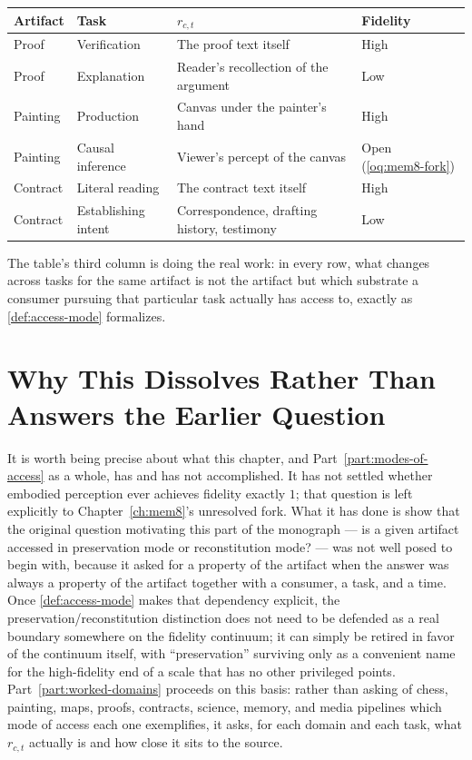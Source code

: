 \begin{center}
\begin{tabular}{lp{2.7cm}p{2.7cm}p{2.7cm}}
\toprule
Artifact & Task & $r_{c,t}$ & Fidelity \\
\midrule
Proof & Verification & The proof text itself & High \\
Proof & Explanation & Reader's recollection of the argument & Low \\
Painting & Production & Canvas under the painter's hand & High \\
Painting & Causal inference & Viewer's percept of the canvas & Open (\cref{oq:mem8-fork}) \\
Contract & Literal reading & The contract text itself & High \\
Contract & Establishing intent & Correspondence, drafting history, testimony & Low \\
\bottomrule
\end{tabular}
\end{center}

The table's third column is doing the real work: in every row, what
changes across tasks for the same artifact is not the artifact but which
substrate a consumer pursuing that particular task actually has access
to, exactly as \cref{def:access-mode} formalizes.

\section{Why This Dissolves Rather Than Answers the Earlier Question}

It is worth being precise about what this chapter, and
Part~\ref{part:modes-of-access} as a whole, has and has not accomplished.
It has not settled whether embodied perception ever achieves fidelity
exactly $1$; that question is left explicitly to
Chapter~\ref{ch:mem8}'s unresolved fork. What it has done is show that
the original question motivating this part of the monograph --- is a
given artifact accessed in preservation mode or reconstitution mode? ---
was not well posed to begin with, because it asked for a property of the
artifact when the answer was always a property of the artifact together
with a consumer, a task, and a time. Once \cref{def:access-mode} makes
that dependency explicit, the preservation/reconstitution distinction
does not need to be defended as a real boundary somewhere on the fidelity
continuum; it can simply be retired in favor of the continuum itself,
with ``preservation'' surviving only as a convenient name for the
high-fidelity end of a scale that has no other privileged points.
Part~\ref{part:worked-domains} proceeds on this basis: rather than asking
of chess, painting, maps, proofs, contracts, science, memory, and media
pipelines which mode of access each one exemplifies, it asks, for each
domain and each task, what $r_{c,t}$ actually is and how close it sits to
the source.
